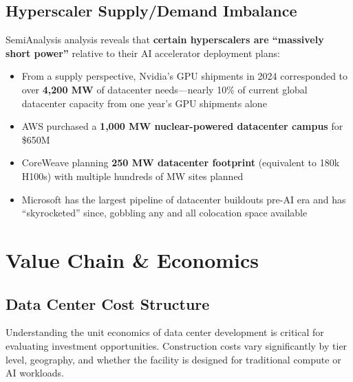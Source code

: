 \documentclass[11pt,a4paper]{article}
\begin{document}
\subsection{Hyperscaler Supply/Demand Imbalance}

SemiAnalysis analysis reveals that \textbf{certain hyperscalers are ``massively short power''} relative to their AI accelerator deployment plans:

\begin{itemize}[leftmargin=*, itemsep=4pt]
    \item From a supply perspective, Nvidia's GPU shipments in 2024 corresponded to over \textbf{4,200 MW} of datacenter needs—nearly 10\% of current global datacenter capacity from one year's GPU shipments alone
    \item AWS purchased a \textbf{1,000 MW nuclear-powered datacenter campus} for \$650M
    \item CoreWeave planning \textbf{250 MW datacenter footprint} (equivalent to 180k H100s) with multiple hundreds of MW sites planned
    \item Microsoft has the largest pipeline of datacenter buildouts pre-AI era and has ``skyrocketed'' since, gobbling any and all colocation space available
\end{itemize}

\newpage

\section{Value Chain \& Economics}

\subsection{Data Center Cost Structure}

Understanding the unit economics of data center development is critical for evaluating investment opportunities. Construction costs vary significantly by tier level, geography, and whether the facility is designed for traditional compute or AI workloads.
\end{document}
